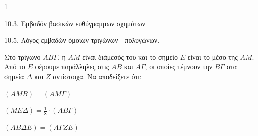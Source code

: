 \begin{ylh}{1}
    \item 10.3. Εμβαδόν βασικών ευθύγραμμων σχημάτων
    \item 10.5. Λόγος εμβαδών όμοιων τριγώνων - πολυγώνων.
\end{ylh}
Στο τρίγωνο $AB\Gamma$, η $AM$ είναι διάμεσός του και το σημείο $E$ είναι το μέσο της $AM$. Από το $E$ φέρουμε παράλληλες στις $AB$ και $A\Gamma$, οι οποίες τέμνουν την $B\Gamma$ στα σημεία $\Delta$ και $Z$ αντίστοιχα.
Να αποδείξετε ότι:
\begin{alist}
\item $(AMB) = (AM\Gamma)$ 
\item $(ME\Delta) = \frac{1}{8} \cdot (AB\Gamma)$ 
\item $(AB\Delta E) = (A\Gamma ZE)$ 
\end{alist}